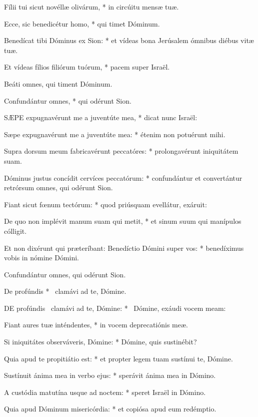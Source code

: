 Fílii tui sicut novéllæ olivárum, * in circúitu mensæ tuæ.

Ecce, sic benedicétur homo, * qui timet Dóminum.

Benedícat tibi Dóminus ex Sion: * et vídeas bona Jerúsalem ómnibus diébus vitæ tuæ.

Et vídeas fílios filiórum tuórum, * pacem super Israël.

 Beáti omnes, qui timent Dóminum.

 Confundántur omnes, * qui odérunt Sion.


\lettrine[lines=2]{S}{ÆPE} expugnavérunt me a juventúte mea, * dicat nunc Israël:

Sæpe expugnavérunt me a juventúte mea: * étenim non potuérunt mihi.

Supra dorsum meum fabricavérunt peccatóres: * prolongavérunt iniquitátem suam.

Dóminus justus concídit cervíces peccatórum: * confundántur et convertántur retrórsum omnes, qui odérunt Sion.

Fiant sicut fœnum tectórum: * quod priúsquam evellátur, exáruit:

De quo non implévit manum suam qui metit, * et sinum suum qui manípulos cólligit.

Et non dixérunt qui præteríbant: Benedíctio Dómini super vos: * benedíximus vobis in nómine Dómini.

 Confundántur omnes, qui odérunt Sion.

 De profúndis * \textdagger\ clamávi ad te, Dómine. \textdaggerdbl


\lettrine[lines=2]{D}{E} profúndis \textdagger\ clamávi ad te, Dómine: * \textdaggerdbl\ Dómine, exáudi vocem meam:

Fiant aures tuæ inténdentes, * in vocem deprecatiónis meæ.

Si iniquitátes observáveris, Dómine: * Dómine, quis sustinébit?

Quia apud te propitiátio est: * et propter legem tuam sustínui te, Dómine.

Sustínuit ánima mea in verbo ejus: * sperávit ánima mea in Dómino.

A custódia matutína usque ad noctem: * speret Israël in Dómino.

Quia apud Dóminum misericórdia: * et copiósa apud eum redémptio.

